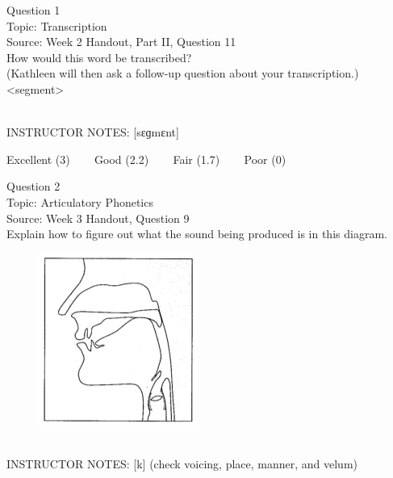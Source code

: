 \documentclass[12pt]{article}
\begin{document}
\begin{center}
\textbf{{\color{blue}{\HUGE START OF EXAM\\}}}

\textbf{{\color{blue}{\HUGE Student ID: 98910\\}}}

\textbf{{\color{blue}{\HUGE \\}}}

\end{center}
\newpage

{\large Question 1}\\

Topic: Transcription\\
Source: Week 2 Handout, Part II, Question 11\\

How would this word be transcribed?\\ (Kathleen will then ask a follow-up question about your transcription.)\\

<segment>


~\\
INSTRUCTOR NOTES: [sɛɡmɛnt]


\vfill
Excellent (3) ~~~ Good (2.2) ~~~ Fair (1.7) ~~~ Poor (0)
\newpage

{\large Question 2}\\

Topic: Articulatory Phonetics\\
Source: Week 3 Handout, Question 9\\

Explain how to figure out what the sound being produced is in this diagram.\\

\begin{figure}[H]
\includegraphics{../images/sagittal_k.png}
\end{figure}

~\\
INSTRUCTOR NOTES: [k] (check voicing, place, manner, and velum)
\end{document}
